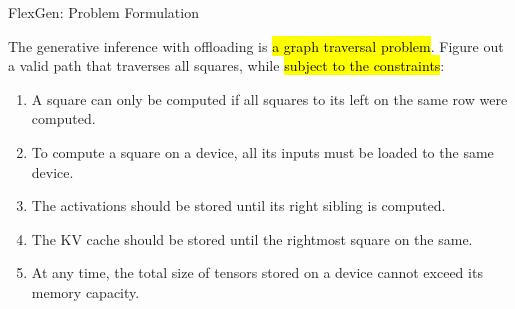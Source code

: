 \begin{frame}{FlexGen: Problem Formulation}
\begin{figure}
\end{figure}

\footnotesize{

The generative inference with offloading is \hl{a graph traversal problem}. Figure out a valid path that traverses all squares, while \hl{subject to the constraints}:

\begin{enumerate}
    \item A square can only be computed if all squares to its left on the same row were computed.
    \item To compute a square on a device, all its inputs must be loaded to the same device.
    \item The activations should be stored until its right sibling is computed. \item The KV cache should be stored until the rightmost square on the same.
    \item At any time, the total size of tensors stored on a device cannot exceed its memory capacity.
\end{enumerate}
}
\end{frame}

